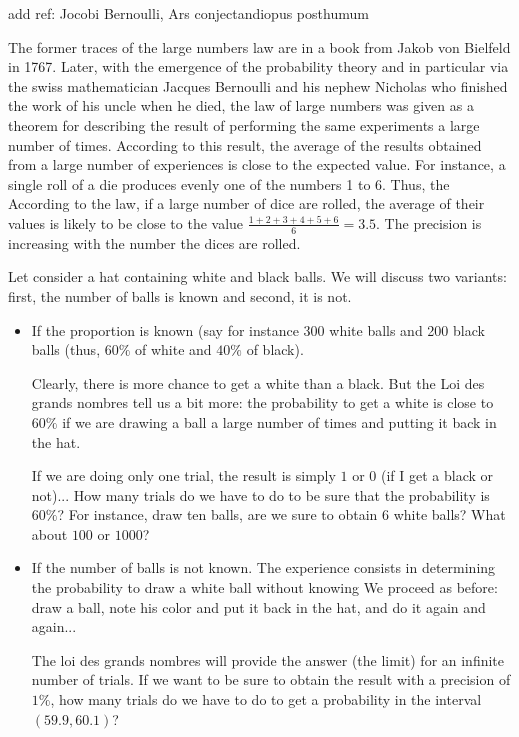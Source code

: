 {\Denis add ref: Jocobi Bernoulli, Ars conjectandiopus posthumum}

The former traces of the large numbers law are in a book from Jakob von Bielfeld in 1767.
Later, with the emergence of the probability theory and in particular via the swiss mathematician Jacques Bernoulli
and his nephew Nicholas who finished the work of his uncle when he died, 
the law of large numbers was given as a theorem for describing the result of performing the same experiments
 a large number of times. 
 According to this result, the average of the results obtained from a large number of experiences is close 
 to the expected value. 
For instance, a single roll of a die produces evenly one of the numbers 1 to 6.
Thus, the According to the law, if a large number of dice are rolled, the average of their values 
is likely to be close to the value $\frac{1+2+3+4+5+6}{6}=3.5$.
The precision is increasing with the number the dices are rolled. 

\bigskip

Let consider a hat containing white and black balls.
We will discuss two variants: first, the number of balls is known and second, it is not.

\begin{itemize}
\item If the proportion is known (say for instance 300 white balls and 200 black balls
(thus, $60\%$ of white and $40\%$ of black).

Clearly, there is more chance to get a white than a black.
But the Loi des grands nombres tell us a bit more: the probability to get a white is close to $60\%$
if we are drawing a ball a large number of times and putting it back in the hat.

If we are doing only one trial, the result is simply $1$ or $0$ (if I get a black or not)...
How many trials do we have to do to be sure that the probability is $60\%$?
For instance, draw ten balls, are we sure to obtain $6$ white balls? What about $100$ or $1000$?
\item If the number of balls is not known.
The experience consists in determining the probability to draw a white ball without knowing 
We proceed as before:
draw a ball, note his color and put it back in the hat, and do it again and again...

The loi des grands nombres will provide the answer (the limit) for an infinite number of trials.
If we want to be sure to obtain the result with a precision of $1\%$,
how many trials do we have to do to get a probability in the interval $(59.9,60.1)$?
\end{itemize}

